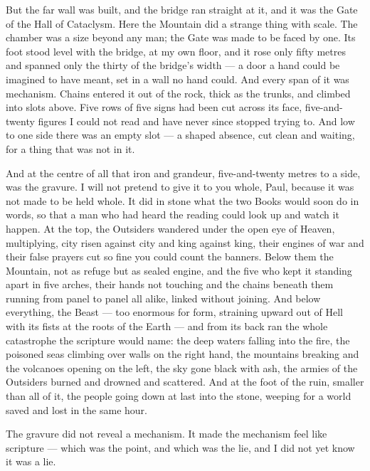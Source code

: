 But the far wall was built, and the bridge ran straight at it, and it was the Gate of the Hall of Cataclysm. Here the Mountain did a strange thing with scale. The chamber was a size beyond any man; the Gate was made to be faced by one. Its foot stood level with the bridge, at my own floor, and it rose only fifty metres and spanned only the thirty of the bridge's width — a door a hand could be imagined to have meant, set in a wall no hand could. And every span of it was mechanism. Chains entered it out of the rock, thick as the trunks, and climbed into slots above. Five rows of five signs had been cut across its face, five-and-twenty figures I could not read and have never since stopped trying to. And low to one side there was an empty slot — a shaped absence, cut clean and waiting, for a thing that was not in it.\par

And at the centre of all that iron and grandeur, five-and-twenty metres to a side, was the gravure. I will not pretend to give it to you whole, Paul, because it was not made to be held whole. It did in stone what the two Books would soon do in words, so that a man who had heard the reading could look up and watch it happen. At the top, the Outsiders wandered under the open eye of Heaven, multiplying, city risen against city and king against king, their engines of war and their false prayers cut so fine you could count the banners. Below them the Mountain, not as refuge but as sealed engine, and the five who kept it standing apart in five arches, their hands not touching and the chains beneath them running from panel to panel all alike, linked without joining. And below everything, the Beast — too enormous for form, straining upward out of Hell with its fists at the roots of the Earth — and from its back ran the whole catastrophe the scripture would name: the deep waters falling into the fire, the poisoned seas climbing over walls on the right hand, the mountains breaking and the volcanoes opening on the left, the sky gone black with ash, the armies of the Outsiders burned and drowned and scattered. And at the foot of the ruin, smaller than all of it, the people going down at last into the stone, weeping for a world saved and lost in the same hour.\par

The gravure did not reveal a mechanism. It made the mechanism feel like scripture — which was the point, and which was the lie, and I did not yet know it was a lie.\par
 
